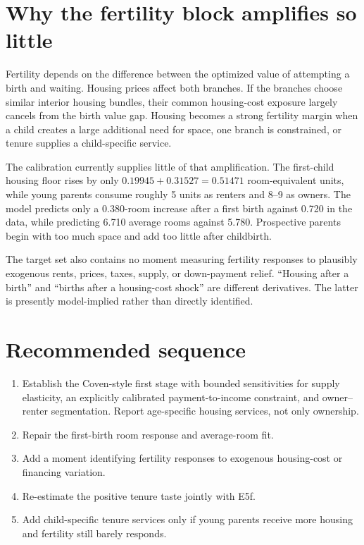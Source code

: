 \documentclass[10pt]{article}
\begin{document}
\section*{Why the fertility block amplifies so little}

Fertility depends on the difference between the optimized value of attempting a birth and waiting. Housing prices affect both branches. If the branches choose similar interior housing bundles, their common housing-cost exposure largely cancels from the birth value gap. Housing becomes a strong fertility margin when a child creates a large additional need for space, one branch is constrained, or tenure supplies a child-specific service.

The calibration currently supplies little of that amplification. The first-child housing floor rises by only $0.19945+0.31527=0.51471$ room-equivalent units, while young parents consume roughly 5 units as renters and 8--9 as owners. The model predicts only a 0.380-room increase after a first birth against 0.720 in the data, while predicting 6.710 average rooms against 5.780. Prospective parents begin with too much space and add too little after childbirth.

The target set also contains no moment measuring fertility responses to plausibly exogenous rents, prices, taxes, supply, or down-payment relief. ``Housing after a birth'' and ``births after a housing-cost shock'' are different derivatives. The latter is presently model-implied rather than directly identified.

\section*{Recommended sequence}

\begin{enumerate}
  \item Establish the Coven-style first stage with bounded sensitivities for supply elasticity, an explicitly calibrated payment-to-income constraint, and owner--renter segmentation. Report age-specific housing services, not only ownership.
  \item Repair the first-birth room response and average-room fit.
  \item Add a moment identifying fertility responses to exogenous housing-cost or financing variation.
  \item Re-estimate the positive tenure taste jointly with E5f.
  \item Add child-specific tenure services only if young parents receive more housing and fertility still barely responds.
\end{enumerate}
\end{document}

